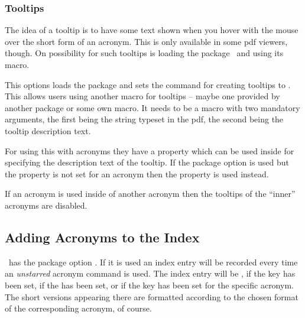\documentclass[load-preamble+]{cnltx-doc}
\begin{document}
\subsubsection{Tooltips}

The idea of a tooltip is to have some text shown when you hover with the
mouse over the short form of an acronym.  This is only available in some
\acs{pdf} viewers, though.  On possibility for such tooltips is loading the
 package~\cite{pkg:pdfcomment} and using its 
macro.

\begin{options}
    This options loads the  package and sets
    the command for creating tooltips to .
    This allows users using another macro for tooltips --
    maybe one provided by another package or some own macro.  It needs to be a
    macro with two mandatory arguments, the first being the string typeset in
    the \acs{pdf}, the second being the tooltip description text.
\end{options}

For using this with acronyms they have a property  which can
be used inside  for specifying the description text of the
tooltip.  If the  package option is used but the property is
not set for an acronym then the  property is used instead.

If an acronym is used inside of another acronym then the tooltips of the
``inner'' acronyms are disabled.

\subsection{Adding Acronyms to the Index}\label{ssec:index}
\noindent{}\acro\ has the package option .  If it is
used an index entry will be recorded every time an \emph{unstarred} acronym
command is used.  The index entry will be ,
 if the  key has been set,
 if the  has been set,
or  if the key  has been set for the specific
acronym.  The short versions appearing there are formatted according to the
chosen format of the corresponding acronym, of course.
\end{document}
